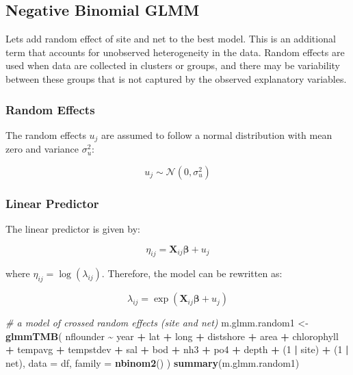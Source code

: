 \documentclass[
]{article}
\newenvironment{Shaded}{\begin{snugshade}}{\end{snugshade}}
\newcommand{\AttributeTok}[1]{\textcolor[rgb]{0.13,0.29,0.53}{#1}}
\newcommand{\CommentTok}[1]{\textcolor[rgb]{0.56,0.35,0.01}{\textit{#1}}}
\newcommand{\DecValTok}[1]{\textcolor[rgb]{0.00,0.00,0.81}{#1}}
\newcommand{\FunctionTok}[1]{\textcolor[rgb]{0.13,0.29,0.53}{\textbf{#1}}}
\newcommand{\NormalTok}[1]{#1}
\newcommand{\OtherTok}[1]{\textcolor[rgb]{0.56,0.35,0.01}{#1}}
\newcommand{\SpecialCharTok}[1]{\textcolor[rgb]{0.81,0.36,0.00}{\textbf{#1}}}
\begin{document}
\subsection{Negative Binomial GLMM}\label{negative-binomial-glmm}

Lets add random effect of site and net to the best model. This is an
additional term that accounts for unobserved heterogeneity in the data.
Random effects are used when data are collected in clusters or groups,
and there may be variability between these groups that is not captured
by the observed explanatory variables.

\subsubsection{Random Effects}\label{random-effects}

The random effects \(u_j\) are assumed to follow a normal distribution
with mean zero and variance \(\sigma^2_u\):

\[
u_j \sim \mathcal{N}(0, \sigma^2_u)
\]

\subsubsection{Linear Predictor}\label{linear-predictor-1}

The linear predictor is given by:

\[
\eta_{ij} = \mathbf{X}_{ij} \boldsymbol{\beta} + u_j
\]

where \(\eta_{ij} = \log(\lambda_{ij})\). Therefore, the model can be
rewritten as:

\[
\lambda_{ij} = \exp(\mathbf{X}_{ij} \boldsymbol{\beta} + u_j)
\]

\begin{Shaded}
\begin{Highlighting}[]
\CommentTok{\# a model of crossed random effects (site and net)}
\NormalTok{m.glmm.random1 }\OtherTok{\textless{}{-}} \FunctionTok{glmmTMB}\NormalTok{(}
\NormalTok{  nflounder }\SpecialCharTok{\textasciitilde{}}\NormalTok{ year }\SpecialCharTok{+}\NormalTok{ lat }\SpecialCharTok{+}\NormalTok{ long }\SpecialCharTok{+}\NormalTok{ distshore }\SpecialCharTok{+}\NormalTok{ area }\SpecialCharTok{+}\NormalTok{ chlorophyll }\SpecialCharTok{+}\NormalTok{ tempavg }\SpecialCharTok{+}\NormalTok{ tempstdev }\SpecialCharTok{+}\NormalTok{ sal }\SpecialCharTok{+}\NormalTok{ bod }\SpecialCharTok{+}\NormalTok{ nh3 }\SpecialCharTok{+}\NormalTok{ po4 }\SpecialCharTok{+}\NormalTok{ depth }\SpecialCharTok{+}\NormalTok{ (}\DecValTok{1} \SpecialCharTok{|}\NormalTok{ site) }\SpecialCharTok{+}\NormalTok{ (}\DecValTok{1} \SpecialCharTok{|}\NormalTok{ net), }
  \AttributeTok{data =}\NormalTok{ df, }
  \AttributeTok{family =} \FunctionTok{nbinom2}\NormalTok{()}
\NormalTok{)}
\FunctionTok{summary}\NormalTok{(m.glmm.random1)}
\end{Highlighting}
\end{Shaded}
\end{document}
